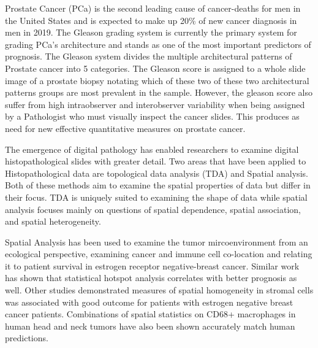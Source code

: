     Prostate Cancer (PCa) is the second leading cause of cancer-deaths for men in the United States and is expected to make
    up 20\% of new cancer diagnosis in men in 2019\cite{siegel2019cancer}.
    The Gleason grading system is currently the primary system for grading PCa's architecture and stands as one of the
        most important predictors of prognosis.
    The Gleason system divides the multiple architectural patterns of Prostate cancer into 5 categories.
    The Gleason score is assigned to a whole slide image of a prostate biopsy notating which of these two of these two
        architectural patterns groups are most prevalent in the sample.
    However, the gleason score also suffer from high intraobserver and interobserver variability when being assigned by
    a Pathologist who must visually inspect the cancer slides.\cite{walsh2013gleason}
    This produces as need for new effective quantitative measures on prostate cancer.

    The emergence of digital pathology has enabled researchers to examine digital histopathological slides with greater
        detail.
    Two areas that have been applied to Histopathological data are topological data analysis (TDA) and Spatial analysis.
    Both of these methods aim to examine the spatial properties of data but differ in their focus.
    TDA is uniquely suited to examining the shape of data while spatial analysis focuses mainly on questions of
    spatial dependence, spatial association, and spatial heterogeneity.\cite{de_smith_geospatial_2018}

    Spatial Analysis has been used to examine the tumor mircoenvironment from an ecological perspective, examining cancer
        and immune cell co-location and relating it to patient survival in estrogen receptor negative-breast cancer.
    Similar work has shown that statistical hotspot analysis correlates with better prognosis as well.
    Other studies demonstrated measures of spatial homogeneity in stromal cells was associated with good outcome for
        patients with estrogen negative breast cancer patients.
    Combinations of spatial statistics on CD68+ macrophages in human head and neck tumors have also been shown
        accurately match human predictions. %

